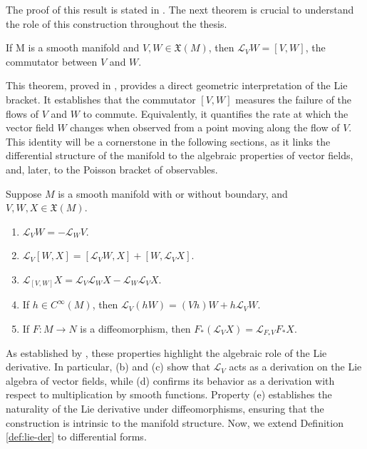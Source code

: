 \noindent The proof of this result is stated in \cite[Lemma 9.36]{leeIntroductionSmoothManifolds2013}. The next theorem is crucial to understand the role of this construction throughout the thesis.

\begin{theorem}\label{thm:lie-der-comm}
	If M is a smooth manifold and $V, W \in \mathfrak{X}(M)$, then $\mathscr{L}_VW = [V,W]$, the commutator between $V$ and $W$.
\end{theorem}

This theorem, proved in \cite[Theorem 9.38]{leeIntroductionSmoothManifolds2013}, provides a direct geometric interpretation of the Lie bracket. It establishes that the commutator $[V,W]$ measures the failure of the flows of $V$ and $W$ to commute. Equivalently, it quantifies the rate at which the vector field $W$ changes when observed from a point moving along the flow of $V$. This identity will be a cornerstone in the following sections, as it links the differential structure of the manifold to the algebraic properties of vector fields, and, later, to the Poisson bracket of observables.

\begin{corollary}
	Suppose $M$ is a smooth manifold with or without boundary, and $V, W, X \in \mathfrak{X}(M)$. 
	\begin{enumerate}
		\item[(a)] $\mathscr{L}_VW = -\mathscr{L}_WV$.
		\item[(b)] $\mathscr{L}_V[W,X] = [\mathscr{L}_VW,X] + [W,\mathscr{L}_VX]$.
		\item[(c)] $\mathscr{L}_{[V,W]}X = \mathscr{L}_V\mathscr{L}_WX - \mathscr{L}_W\mathscr{L}_VX$.
		\item[(d)] If $h \in C^\infty(M)$, then $\mathscr{L}_V(hW) = (Vh)W + h\mathscr{L}_VW$.
		\item[(e)] If $F : M \to N$ is a diffeomorphism, then $F_*(\mathscr{L}_VX) = \mathscr{L}_{F_*V}F_*X$.
	\end{enumerate}
\end{corollary}

As established by \cite[Corollary 9.39]{leeIntroductionSmoothManifolds2013}, these properties highlight the algebraic role of the Lie derivative. In particular, (b) and (c) show that $\mathscr{L}_V$ acts as a derivation on the Lie algebra of vector fields, while (d) confirms its behavior as a derivation with respect to multiplication by smooth functions. Property (e) establishes the naturality of the Lie derivative under diffeomorphisms, ensuring that the construction is intrinsic to the manifold structure. 
Now, we extend Definition \ref{def:lie-der} to differential forms.

